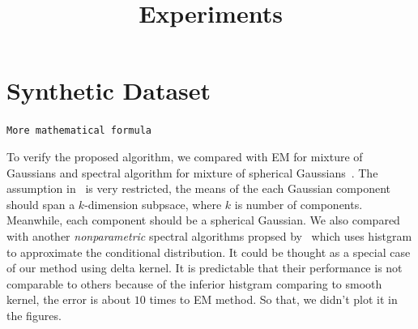 \documentclass[11pt]{article}
\title{Experiments}
\begin{document}
\maketitle








\section{Synthetic Dataset}

\texttt{More mathematical formula}

To verify the proposed algorithm, we compared with EM for mixture of Gaussians and spectral algorithm for mixture of spherical Gaussians~\citep{Hsu13}. The assumption in~\citep{Hsu13} is very restricted, the means of the each Gaussian component should span a $k$-dimension subpsace, where $k$ is number of components. Meanwhile, each component should be a spherical Gaussian. We also compared with another \emph{nonparametric} spectral algorithms propsed by~\citep{Hiroyuki10} which uses histgram to approximate the conditional distribution. It could be thought as a special case of our method using delta kernel. It is predictable that their performance is not comparable to others because of the inferior histgram comparing to smooth kernel, the error is about $10$ times to EM method. So that, we didn't plot it in the figures.
\end{document}

